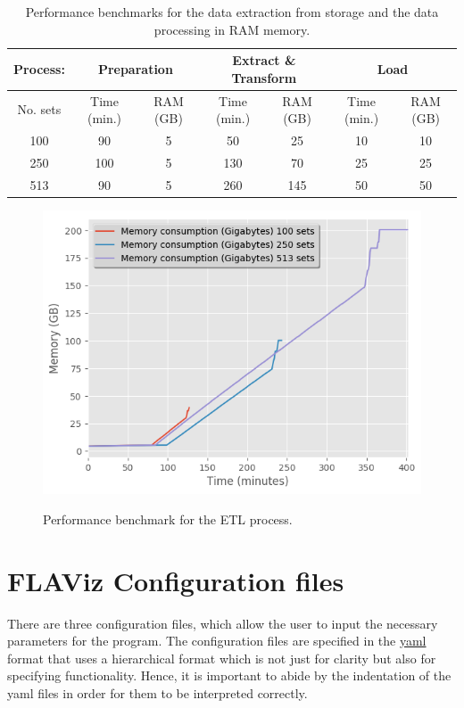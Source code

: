 \documentclass[10pt,a4paper]{article}
\begin{document}
\begin{table}
\label{Tab: Performance}
\begin{tabular}{|c||cc||cc||cc|}
\hline \hline 
Process:  & \multicolumn{2}{|c|}{Preparation} & \multicolumn{2}{|c|}{Extract \& Transform} & \multicolumn{2}{|c|}{Load}\\ 
\hline 
No. sets  & Time (min.) & RAM (GB) & Time (min.) & RAM (GB) & Time (min.) & RAM (GB)\\ 
\hline 
100 & 90 & 5 & 50 & 25 & 10 & 10\\ 
\hline 
250 & 100 & 5 & 130 & 70 & 25 & 25\\ 
\hline 
513 & 90 & 5 & 260 & 145 & 50 & 50\\ 
\hline 
\end{tabular} 
\caption{Performance benchmarks for the data extraction from storage and the data processing in RAM memory.}
\end{table}



\begin{figure}[htb!]
\centering\leavevmode
\graphicspath{{./Benchmarks/}}
%
\centering\leavevmode
\includegraphics[scale=.9]{Fig_all.png} 
\label{Fig: Performance}
\caption{\footnotesize Performance benchmark for the ETL process.}
\end{figure}

\clearpage
\section{FLAViz Configuration files}
\label{Section:2}
There are three configuration files, which allow the user to input the necessary parameters for the program. The configuration files are specified in the \url{yaml} format that uses a hierarchical format which is not just for clarity but also for specifying functionality. Hence, it is important to abide by the indentation of the yaml files in order for them to be interpreted correctly. 
\end{document}
